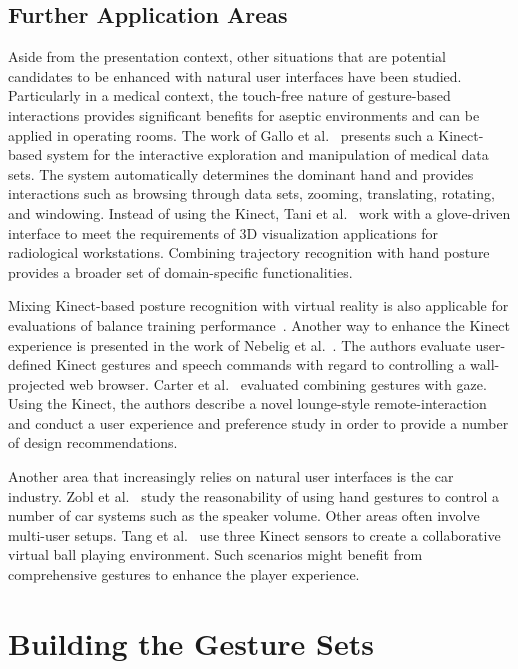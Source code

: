 \documentclass{sigchi}
\begin{document}
\subsection{Further Application Areas}
Aside from the presentation context, other situations that are potential candidates to be enhanced with natural user interfaces have been studied. Particularly in a medical context, the touch-free nature of gesture-based interactions provides significant benefits for aseptic environments and can be applied in operating rooms. The work of Gallo et al.~\cite{Gallo2011} presents such a Kinect-based system for the interactive exploration and manipulation of medical data sets. The system automatically determines the dominant hand and provides interactions such as browsing through data sets, zooming, translating, rotating, and windowing. Instead of using the Kinect, Tani et al.~\cite{Tani:2007:GIR:1251969.1252060} work with a glove-driven interface to meet the requirements of 3D visualization applications for radiological workstations. Combining trajectory recognition with hand posture provides a broader set of domain-specific functionalities. 

Mixing Kinect-based posture recognition with virtual reality is also applicable for evaluations of balance training performance~\cite{Hsieh2013}. Another way to enhance the Kinect experience is presented in the work of Nebelig et al.~\cite{Nebeling:2014:WWR:2669485.2669497}. The authors evaluate user-defined Kinect gestures and speech commands with regard to controlling a wall-projected web browser. Carter et al.~\cite{Carter:2015:RGG:2838739.2838778} evaluated combining gestures with gaze. Using the Kinect, the authors describe a novel lounge-style remote-interaction and conduct a user experience and preference study in order to provide a number of design recommendations.
 

Another area that increasingly relies on natural user interfaces is the car industry. Zobl et al.~\cite{Zobl2004, Zobl01ausability} study the reasonability of using hand gestures to control a number of car systems such as the speaker volume. Other areas often involve multi-user setups. Tang et al.~\cite{Tang:2015:FOD:2702613.2732848} use three Kinect sensors to create a collaborative virtual ball playing environment. Such scenarios might benefit from comprehensive gestures to enhance the player experience.



\section{Building the Gesture Sets}
\end{document}
